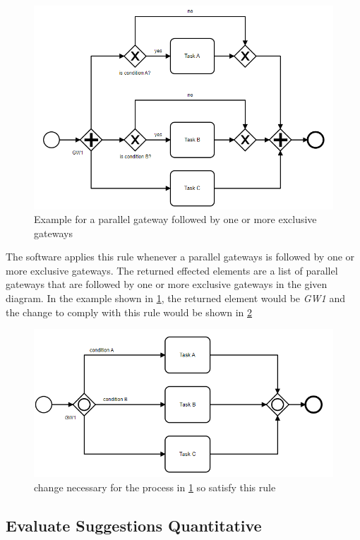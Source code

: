 \begin{figure}[H]
	\centering
	\includegraphics[width=0.7\columnwidth]{graphics/exclusive-suggestion-1}
	\caption{Example for a parallel gateway followed by one or more exclusive gateways} 
	\label{fig:example-GW} 
\end{figure}

The software applies this rule whenever a parallel gateways is followed by one or more exclusive gateways. The returned effected elements are a list of parallel gateways that are followed by one or more exclusive gateways in the given diagram. In the example shown in  \ref{fig:example-GW}, the returned element would be \textit{GW1} and the change to comply with this rule would be shown in \ref{fig:example-GW-fix}
\begin{figure}[H]
	\centering
	\includegraphics[width=0.7\columnwidth]{graphics/exclusive-suggestion-2}
	\caption{change necessary for the process in \ref{fig:example-GW} so satisfy this rule} 
	\label{fig:example-GW-fix} 
\end{figure}
\subsection{Evaluate Suggestions Quantitative}
